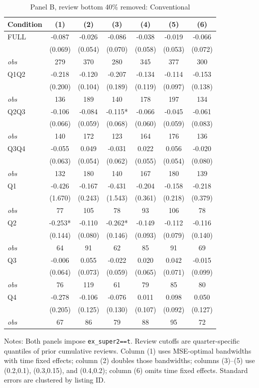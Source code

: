 \begin{table}[!htbp]
\centering
\caption{Panel B, review bottom 40\% removed: Conventional}
\begin{tabular}{lcccccc}
\toprule
Condition & (1) & (2) & (3) & (4) & (5) & (6) \\
\midrule
FULL & -0.087 & -0.026 & -0.086 & -0.038 & -0.019 & -0.066 \\
 & (0.069) & (0.054) & (0.070) & (0.058) & (0.053) & (0.072) \\
\textit{obs} & 279 & 370 & 280 & 345 & 377 & 300 \\
Q1Q2 & -0.218 & -0.120 & -0.207 & -0.134 & -0.114 & -0.153 \\
 & (0.200) & (0.104) & (0.189) & (0.119) & (0.097) & (0.138) \\
\textit{obs} & 136 & 189 & 140 & 178 & 197 & 134 \\
Q2Q3 & -0.106 & -0.084 & -0.115* & -0.066 & -0.045 & -0.061 \\
 & (0.066) & (0.059) & (0.068) & (0.060) & (0.059) & (0.083) \\
\textit{obs} & 140 & 172 & 123 & 164 & 176 & 136 \\
Q3Q4 & -0.055 & 0.049 & -0.031 & 0.022 & 0.056 & -0.020 \\
 & (0.063) & (0.054) & (0.062) & (0.055) & (0.054) & (0.080) \\
\textit{obs} & 132 & 180 & 140 & 167 & 180 & 139 \\
Q1 & -0.426 & -0.167 & -0.431 & -0.204 & -0.158 & -0.218 \\
 & (1.670) & (0.243) & (1.543) & (0.361) & (0.218) & (0.379) \\
\textit{obs} & 77 & 105 & 78 & 93 & 106 & 78 \\
Q2 & -0.253* & -0.110 & -0.262* & -0.149 & -0.112 & -0.116 \\
 & (0.144) & (0.080) & (0.146) & (0.093) & (0.079) & (0.140) \\
\textit{obs} & 64 & 91 & 62 & 85 & 91 & 69 \\
Q3 & -0.006 & 0.055 & -0.022 & 0.020 & 0.042 & -0.015 \\
 & (0.064) & (0.073) & (0.059) & (0.065) & (0.071) & (0.099) \\
\textit{obs} & 76 & 119 & 61 & 79 & 85 & 80 \\
Q4 & -0.278 & -0.106 & -0.076 & 0.011 & 0.098 & 0.050 \\
 & (0.205) & (0.125) & (0.130) & (0.107) & (0.092) & (0.127) \\
\textit{obs} & 67 & 86 & 79 & 88 & 95 & 72 \\
\bottomrule
\end{tabular}
\begin{minipage}{0.98\textwidth}\footnotesize
Notes: Both panels impose \texttt{ex\_super2==t}. Review cutoffs are quarter-specific quantiles of prior cumulative reviews. Column (1) uses MSE-optimal bandwidths with time fixed effects; column (2) doubles those bandwidths; columns (3)--(5) use (0.2,0.1), (0.3,0.15), and (0.4,0.2); column (6) omits time fixed effects. Standard errors are clustered by listing ID.
\end{minipage}
\end{table}


